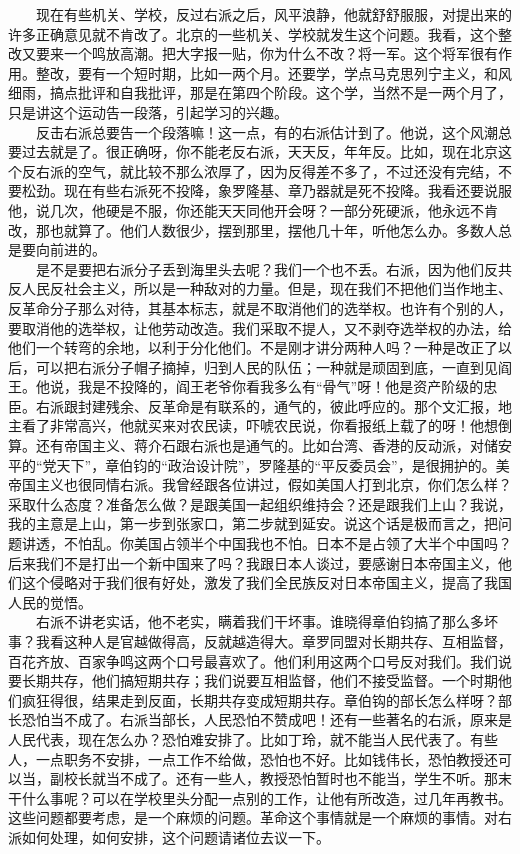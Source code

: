 \documentclass[cn,11pt,chinese]{elegantbook}
\begin{document}
　　现在有些机关、学校，反过右派之后，风平浪静，他就舒舒服服，对提出来的许多正确意见就不肯改了。北京的一些机关、学校就发生这个问题。我看，这个整改又要来一个鸣放高潮。把大字报一贴，你为什么不改？将一军。这个将军很有作用。整改，要有一个短时期，比如一两个月。还要学，学点马克思列宁主义，和风细雨，搞点批评和自我批评，那是在第四个阶段。这个学，当然不是一两个月了，只是讲这个运动告一段落，引起学习的兴趣。\\
　　反击右派总要告一个段落嘛！这一点，有的右派估计到了。他说，这个风潮总要过去就是了。很正确呀，你不能老反右派，天天反，年年反。比如，现在北京这个反右派的空气，就比较不那么浓厚了，因为反得差不多了，不过还没有完结，不要松劲。现在有些右派死不投降，象罗隆基、章乃器就是死不投降。我看还要说服他，说几次，他硬是不服，你还能天天同他开会呀？一部分死硬派，他永远不肯改，那也就算了。他们人数很少，摆到那里，摆他几十年，听他怎么办。多数人总是要向前进的。\\
　　是不是要把右派分子丢到海里头去呢？我们一个也不丢。右派，因为他们反共反人民反社会主义，所以是一种敌对的力量。但是，现在我们不把他们当作地主、反革命分子那么对待，其基本标志，就是不取消他们的选举权。也许有个别的人，要取消他的选举权，让他劳动改造。我们采取不提人，又不剥夺选举权的办法，给他们一个转弯的余地，以利于分化他们。不是刚才讲分两种人吗？一种是改正了以后，可以把右派分子帽子摘掉，归到人民的队伍；一种就是顽固到底，一直到见阎王。他说，我是不投降的，阎王老爷你看我多么有“骨气”呀！他是资产阶级的忠臣。右派跟封建残余、反革命是有联系的，通气的，彼此呼应的。那个文汇报，地主看了非常高兴，他就买来对农民读，吓唬农民说，你看报纸上载了的呀！他想倒算。还有帝国主义、蒋介石跟右派也是通气的。比如台湾、香港的反动派，对储安平的“党天下”，章伯钧的“政治设计院”，罗隆基的“平反委员会”，是很拥护的。美帝国主义也很同情右派。我曾经跟各位讲过，假如美国人打到北京，你们怎么样？采取什么态度？准备怎么做？是跟美国一起组织维持会？还是跟我们上山？我说，我的主意是上山，第一步到张家口，第二步就到延安。说这个话是极而言之，把问题讲透，不怕乱。你美国占领半个中国我也不怕。日本不是占领了大半个中国吗？后来我们不是打出一个新中国来了吗？我跟日本人谈过，要感谢日本帝国主义，他们这个侵略对于我们很有好处，激发了我们全民族反对日本帝国主义，提高了我国人民的觉悟。\\
　　右派不讲老实话，他不老实，瞒着我们干坏事。谁晓得章伯钧搞了那么多坏事？我看这种人是官越做得高，反就越造得大。章罗同盟对长期共存、互相监督，百花齐放、百家争鸣这两个口号最喜欢了。他们利用这两个口号反对我们。我们说要长期共存，他们搞短期共存；我们说要互相监督，他们不接受监督。一个时期他们疯狂得很，结果走到反面，长期共存变成短期共存。章伯钩的部长怎么样呀？部长恐怕当不成了。右派当部长，人民恐怕不赞成吧！还有一些著名的右派，原来是人民代表，现在怎么办？恐怕难安排了。比如丁玲，就不能当人民代表了。有些人，一点职务不安排，一点工作不给做，恐怕也不好。比如钱伟长，恐怕教授还可以当，副校长就当不成了。还有一些人，教授恐怕暂时也不能当，学生不听。那末干什么事呢？可以在学校里头分配一点别的工作，让他有所改造，过几年再教书。这些问题都要考虑，是一个麻烦的问题。革命这个事情就是一个麻烦的事情。对右派如何处理，如何安排，这个问题请诸位去议一下。\\
\end{document}
